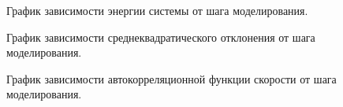 \documentclass[14pt,a4paper,report]{ncc}
\begin{document}
\begin{figure}[h!]
\caption{График зависимости энергии системы от шага моделирования.}
\label{ris:image17}
\end{figure}
\begin{figure}[h!]
\caption{График зависимости среднеквадратического отклонения от шага моделирования.}
\label{ris:image18}
\end{figure}
\begin{figure}[h!]
\caption{График зависимости автокорреляционной функции скорости от шага моделирования.}
\label{ris:image19}
\end{figure}
\end{document}
